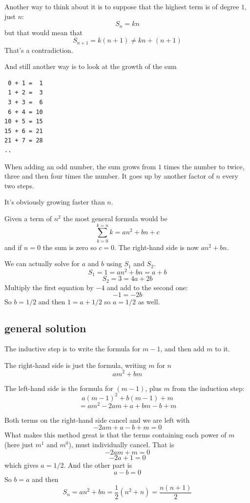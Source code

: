 \documentclass[11pt, oneside]{article}
\begin{document}
Another way to think about it is to suppose that the highest term is of degree $1$, just $n$:
\[ S_n = kn \]
but that would mean that
\[ S_{n+1} = k(n+1) \ne kn + (n + 1) \]
That's a contradiction.

And still another way is to look at the growth of the sum 
\begin{verbatim}
 0 + 1 =  1
 1 + 2 =  3
 3 + 3 =  6
 6 + 4 = 10
10 + 5 = 15
15 + 6 = 21
21 + 7 = 28
..
\end{verbatim}
When adding an odd number, the sum grows from $1$ times the number to twice, three and then four times the number.  It goes up by another factor of $n$ every two steps.  

It's obviously growing faster than $n$.

Given a term of $n^2$ the most general formula would be
\[ \sum_{k=0}^{k=n} k = an^2 + bn + c \]
and if $n=0$ the sum is zero so $c = 0$.  The right-hand side is now $an^2 + bn$.

We can actually solve for $a$ and $b$ using $S_1$ and $S_2$.
\[ S_1 = 1 = an^2 + bn = a + b \]
\[ S_2 = 3 = 4a + 2b \]
Multiply the first equation by $-4$ and add to the second one:
\[ -1 = -2b \]
So $b = 1/2$ and then $1 = a + 1/2$ so $a = 1/2$ as well.

\subsection*{general solution}

The inductive step is to write the formula for $m-1$, and then add $m$ to it.

The right-hand side is just the formula, writing $m$ for $n$
\[ am^2 + bm \]

The left-hand side is the formula for $(m-1)$, plus $m$ from the induction step:
\[ a(m-1)^2 + b(m-1) + m \]
\[ = am^2 - 2am + a + bm - b + m \]

Both terms on the right-hand side cancel and we are left with
\[ - 2am + a - b + m = 0 \]
What makes this method great is that the terms containing each power of $m$ (here just $m^1$ and $m^0$), must individually cancel.  That is
\[ -2am + m = 0 \]
\[ -2a + 1 = 0 \]
which gives $a = 1/2$.  And the other part is
\[ a - b = 0 \]
So $b = a$ and then
\[ S_n = an^2 + bn = \frac{1}{2}(n^2 + n)  = \frac{n(n + 1)}{2} \]
\end{document}
